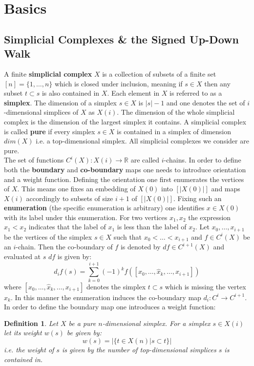 \documentclass[11pt]{amsart}
\newtheorem{definition}[theorem]{Definition}
\begin{document}
    \section{Basics}
    \subsection{Simplicial Complexes \& the Signed Up-Down Walk}
    A finite \textbf{simplicial complex} $X$ is a collection of subsets of a finite set $[n]=\{1,\dots, n\}$  which is closed under inclusion, meaning if $s\in X$ then any subset $t\subset s$ is also contained in $X$. Each element in $X$ is referred to as a \textbf{simplex}. The dimension of a simplex $s\in X$ is $|s|-1$ and one denotes the set of $i$-dimensional simplices of $X$ as $X(i)$. The dimension of the whole simplicial complex is the dimension of the largest simplex it contains. A simplicial complex is called \textbf{pure} if every simplex $s\in X$ is contained in a simplex of  dimension $dim(X)$ i.e. a top-dimensional simplex. All simplicial complexes we consider are pure.\\
    The set of functions $C^i(X):X(i)\rightarrow \mathbb{R}$ are called $i$-chains. In order to define both the \textbf{boundary} and \textbf{co-boundary} maps one needs to introduce orientation and a weight function. Defining the orientation one first enumerates the vertices of $X$. This means one fixes an embedding of $X(0)$ into $[|X(0)|]$ and maps $X(i)$ accordingly to subsets of size $i+1$ of $[|X(0)|]$. Fixing such an \textbf{enumeration} (the specific enumeration is arbitrary) one identifies $x\in X(0)$ with its label under this enumeration. For two vertices $x_1,x_2$ the expression $x_1<x_2$ indicates that the label of $x_1$ is less than the label of $x_2$. Let $x_0,\dots, x_{i+1}$ be the vertices of the simplex $s\in X$ such that $x_0<\dots<x_{i+1}$ and $f\in C^i(X)$ be an $i$-chain. Then the co-boundary of $f$ is denoted by $df\in C^{i+1}(X)$ and evaluated at $s$ $df$ is given by:
    \begin{equation}
        d_if(s)=\sum_{k=0}^{i+1} (-1)^k f([x_0,\dots, \hat{x}_k,\dots, x_{i+1}])
        \label{eq:CoBoundaryOperator}
    \end{equation}
    where $[x_0,\dots, \hat{x}_k,\dots, x_{i+1}]$ denotes the simplex $t\subset s$ which is missing the vertex $x_k$. In this manner the enumeration induces the co-boundary map $d_i: C^i\rightarrow C^{i+1}$. In order to define the boundary map one introduces a weight function:
    \begin{definition}
        Let $X$ be a pure $n$-dimensional simplex. For a simplex $s\in X(i)$ let its weight $w(s)$ be given by:
        \begin{equation}
            w(s)=|\{t\in X(n)|s\subset t\}|
        \end{equation}
        i.e. the weight of $s$ is given by the number of top-dimensional simplices $s$ is contained in.
        \label{def:Weight}
    \end{definition}
\end{document}
